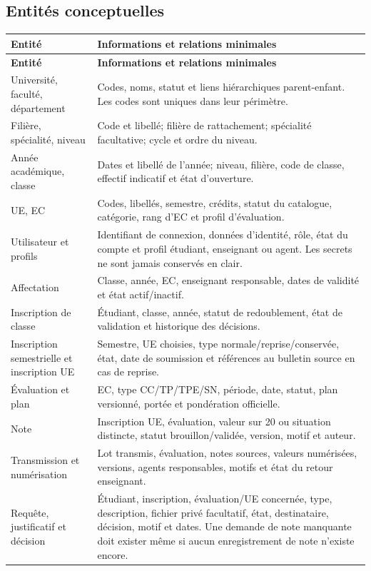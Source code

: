 \documentclass[11pt,a4paper]{article}
\begin{document}
\subsection{Entités conceptuelles}
\begin{longtable}{L{3.3cm}L{12.0cm}}
\toprule
\textbf{Entité} & \textbf{Informations et relations minimales} \\
\midrule
\endfirsthead
\toprule
\textbf{Entité} & \textbf{Informations et relations minimales} \\
\midrule
\endhead
Université, faculté, département & Codes, noms, statut et liens hiérarchiques parent-enfant. Les codes sont uniques dans leur périmètre. \\
Filière, spécialité, niveau & Code et libellé; filière de rattachement; spécialité facultative; cycle et ordre du niveau. \\
Année académique, classe & Dates et libellé de l'année; niveau, filière, code de classe, effectif indicatif et état d'ouverture. \\
UE, EC & Codes, libellés, semestre, crédits, statut du catalogue, catégorie, rang d'EC et profil d'évaluation. \\
Utilisateur et profils & Identifiant de connexion, données d'identité, rôle, état du compte et profil étudiant, enseignant ou agent. Les secrets ne sont jamais conservés en clair. \\
Affectation & Classe, année, EC, enseignant responsable, dates de validité et état actif/inactif. \\
Inscription de classe & Étudiant, classe, année, statut de redoublement, état de validation et historique des décisions. \\
Inscription semestrielle et inscription UE & Semestre, UE choisies, type normale/reprise/conservée, état, date de soumission et références au bulletin source en cas de reprise. \\
Évaluation et plan & EC, type CC/TP/TPE/SN, période, date, statut, plan versionné, portée et pondération officielle. \\
Note & Inscription UE, évaluation, valeur sur 20 ou situation distincte, statut brouillon/validée, version, motif et auteur. \\
Transmission et numérisation & Lot transmis, évaluation, notes sources, valeurs numérisées, versions, agents responsables, motifs et état du retour enseignant. \\
Requête, justificatif et décision & Étudiant, inscription, évaluation/UE concernée, type, description, fichier privé facultatif, état, destinataire, décision, motif et dates. Une demande de note manquante doit exister même si aucun enregistrement de note n'existe encore. \\

\end{longtable}
\end{document}
